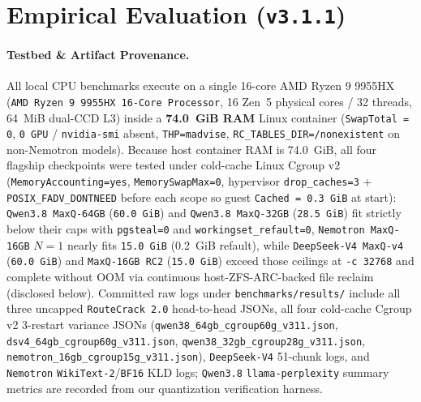 \documentclass[10pt,twocolumn]{article}
\begin{document}
\section{Empirical Evaluation (\texttt{v3.1.1})}
\label{sec:eval}

\paragraph{Testbed \& Artifact Provenance.}
All local CPU benchmarks execute on a single 16-core AMD Ryzen 9 9955HX (\texttt{AMD Ryzen 9 9955HX 16-Core Processor}, 16 Zen~5 physical cores / 32 threads, 64~MiB dual-CCD L3) inside a \textbf{74.0~GiB RAM} Linux container (\texttt{SwapTotal = 0}, \texttt{0 GPU} / \texttt{nvidia-smi} absent, \texttt{THP=madvise}, \texttt{RC\_TABLES\_DIR=/nonexistent} on non-Nemotron models). Because host container RAM is 74.0~GiB, all four flagship checkpoints were tested under cold-cache Linux Cgroup v2 (\texttt{MemoryAccounting=yes}, \texttt{MemorySwapMax=0}, hypervisor \texttt{drop\_caches=3} + \texttt{POSIX\_FADV\_DONTNEED} before each scope so guest \texttt{Cached = 0.3~GiB} at start): \texttt{Qwen3.8 MaxQ-64GB} (\texttt{60.0~GiB}) and \texttt{Qwen3.8 MaxQ-32GB} (\texttt{28.5~GiB}) fit strictly below their caps with \texttt{pgsteal=0} and \texttt{workingset\_refault=0}, \texttt{Nemotron MaxQ-16GB} $N=1$ nearly fits \texttt{15.0~GiB} (0.2~GiB refault), while \texttt{DeepSeek-V4 MaxQ-v4} (\texttt{60.0~GiB}) and \texttt{MaxQ-16GB RC2} (\texttt{15.0~GiB}) exceed those ceilings at \texttt{-c 32768} and complete without OOM via continuous host-ZFS-ARC-backed file reclaim (disclosed below). Committed raw logs under \texttt{benchmarks/results/} include all three uncapped \texttt{RouteCrack 2.0} head-to-head JSONs, all four cold-cache Cgroup v2 3-restart variance JSONs (\texttt{qwen38\_64gb\_cgroup60g\_v311.json}, \texttt{dsv4\_64gb\_cgroup60g\_v311.json}, \texttt{qwen38\_32gb\_cgroup28g\_v311.json}, \texttt{nemotron\_16gb\_cgroup15g\_v311.json}), \texttt{DeepSeek-V4} 51-chunk logs, and \texttt{Nemotron} \texttt{WikiText-2}/\texttt{BF16} KLD logs; \texttt{Qwen3.8} \texttt{llama-perplexity} summary metrics are recorded from our quantization verification harness.
\end{document}
